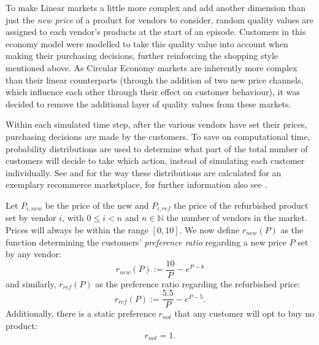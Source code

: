 To make Linear markets a little more complex and add another dimension than just the \emph{new price} of a product for vendors to consider, random quality values are assigned to each vendor's products at the start of an episode. Customers in this economy model were modelled to take this quality value into account when making their purchasing decisions, further reinforcing the shopping style mentioned above. As Circular Economy markets are inherently more complex than their linear counterparts (through the addition of two new price channels, which influence each other through their effect on customer behaviour), it was decided to remove the additional layer of quality values from these markets.

Within each simulated time step, after the various vendors have set their prices, purchasing decisions are made by the customers. To save on computational time, probability distributions are used to determine what part of the total number of customers will decide to take which action, instead of simulating each customer individually. See  and  for the way these distributions are calculated for an exemplary recommerce marketplace, for further information also see \cite{NickThesis}.

\clearpage
\begin{definition}\label{def:customerDecisions}
	Let \(P_{i, new}\) be the price of the new and \(P_{i, ref}\) the price of the refurbished product set by vendor \(i\), with \(0 \leq i < n\) and \(n \in \mathbb{N}\) the number of vendors in the market. Prices will always be within the range \([0,10]\). We now define \(r_{new}(P)\) as the function determining the customers' \emph{preference ratio} regarding a new price \(P\) set by any vendor:
	\begin{equation}\label{eq:NewPref}
		r_{new}(P) := \frac{10}{P} - e^{P - 8}
	\end{equation}
	and similarly, \(r_{ref}(P)\) as the preference ratio regarding the refurbished price:
	\begin{equation}\label{eq:RefPref}
		r_{ref}(P) := \frac{5.5}{P} - e^{P - 5}.
	\end{equation}
	Additionally, there is a static preference \(r_{not}\) that any customer will opt to buy no product:
	\begin{equation}\label{eq:NothingPref}
		r_{not} = 1.
	\end{equation}
\end{definition}

